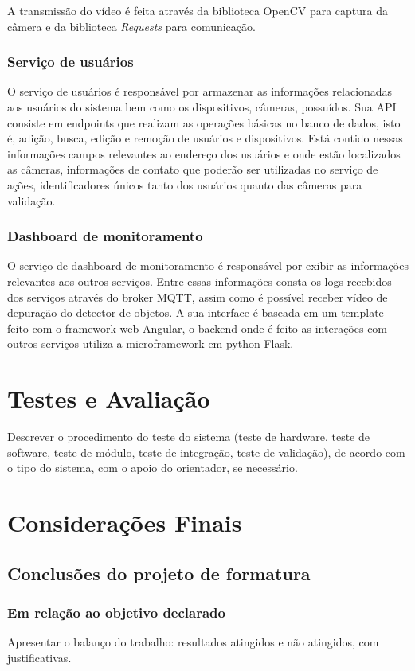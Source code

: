 \documentclass[]{politex}
\begin{document}
A transmissão do vídeo é feita através da biblioteca OpenCV para captura da câmera e da biblioteca \textit{Requests} para comunicação. 

\subsection{Serviço de usuários}
O serviço de usuários é responsável por armazenar as informações relacionadas aos usuários do sistema bem como os dispositivos, câmeras, possuídos. Sua API consiste em endpoints que realizam as operações básicas no banco de dados, isto é, adição, busca, edição e remoção de usuários e dispositivos. Está contido nessas informações campos relevantes ao endereço dos usuários e onde estão localizados as câmeras, informações de contato que poderão ser utilizadas no serviço de ações, identificadores únicos tanto dos usuários quanto das câmeras para validação.

\subsection{Dashboard de monitoramento}
O serviço de dashboard de monitoramento é responsável por exibir as informações relevantes aos outros serviços. Entre essas informações consta os logs recebidos dos serviços através do broker MQTT, assim como é possível receber vídeo de depuração do detector de objetos. A sua interface é baseada em um template feito com o framework web Angular, o backend onde é feito as interações com outros serviços utiliza a microframework em python Flask.

\chapter{Testes e Avaliação}
Descrever o procedimento do teste do sistema (teste de hardware, teste de software, teste de módulo, teste de integração, teste de validação), de acordo com o tipo do sistema, com o apoio do orientador, se necessário.


\chapter{Considerações Finais}

\section{Conclusões do projeto de formatura}
\subsection{Em relação ao objetivo declarado}
Apresentar o balanço do trabalho: resultados atingidos e não atingidos, com justificativas.
\end{document}
